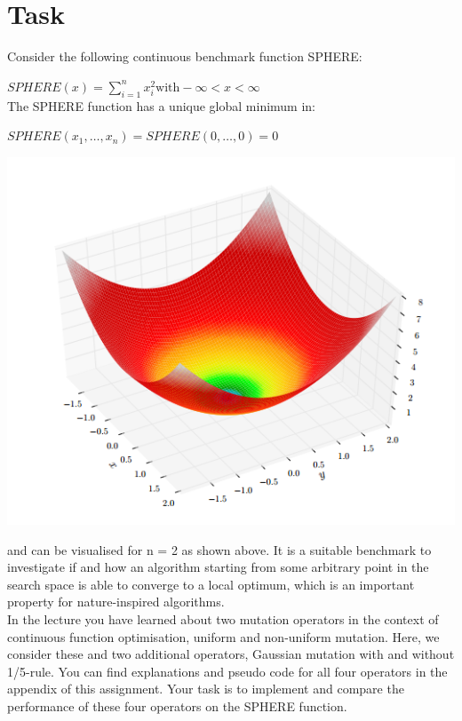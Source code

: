 \documentclass{article}
\begin{document}
    \section{Task}
    \begin{minipage}{0.5\textwidth}
Consider the following continuous benchmark function SPHERE:
	
$\displaystyle SPHERE(x) = \sum_{i=1}^{n} x_i^2  \text{with}  -\infty < x < \infty$
\\

The SPHERE function has a unique global minimum in:

$\displaystyle SPHERE(x_1,\dotsc,x_n) = SPHERE(0,\dotsc,0) = 0$
\end{minipage}
\begin{minipage}{0.5\textwidth}
    \begin{flushright}
\includegraphics[width=\textwidth]{GraphOriginal}
\end{flushright}
\end{minipage}

and can be visualised for n = 2 as shown above. It is a suitable benchmark to investigate if and
how an algorithm starting from some arbitrary point in the search space is able to converge to a
local optimum, which is an important property for nature-inspired algorithms.
\\

In the lecture you have learned about two mutation operators in the context of continuous function
optimisation, uniform and non-uniform mutation. Here, we consider these and two additional
operators, Gaussian mutation with and without 1/5-rule. You can find explanations and pseudo code
for all four operators in the appendix of this assignment. Your task is to implement and compare
the performance of these four operators on the SPHERE function.
\end{document}
